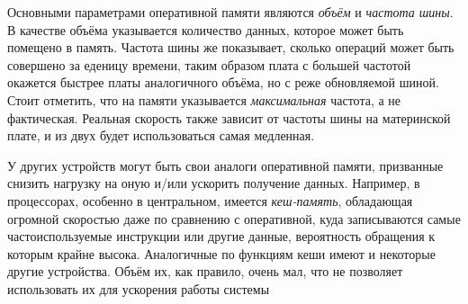 Основными параметрами оперативной памяти являются \emph{объём} и \emph{частота шины}.
В качестве объёма указывается количество данных, которое может быть помещено в память.
Частота шины же показывает, сколько операций может быть совершено за еденицу времени, таким образом плата с большей частотой окажется быстрее платы аналогичного объёма, но с реже обновляемой шиной.
Стоит отметить, что на памяти указывается \emph{максимальная} частота, а не фактическая.
Реальная скорость также зависит от частоты шины на материнской плате, и из двух будет использоваться самая медленная.

У других устройств могут быть свои аналоги оперативной памяти, призванные снизить нагрузку на оную и/или ускорить получение данных.
Например, в процессорах, особенно в центральном, имеется \emph{кеш-память}, обладающая огромной скоростью даже по сравнению с оперативной, куда записываются самые частоиспользуемые инструкции или другие данные, вероятность обращения к которым крайне высока.
Аналогичные по функциям кеши имеют и некоторые другие устройства.
Объём их, как правило, очень мал, что не позволяет использовать их для ускорения работы системы

